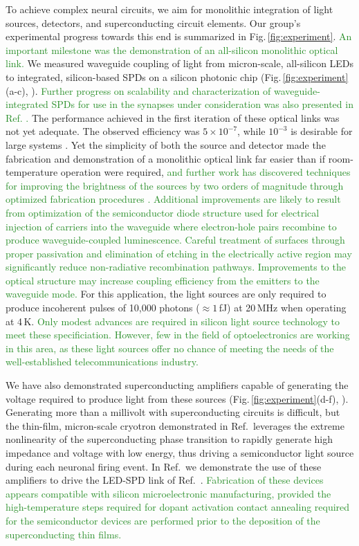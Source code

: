 \documentclass[twocolumn]{article}
\newcommand{\onlinecite}[1]{\hspace{-1 ex} \nocite{#1}\citenum{#1}}
\begin{document}
To achieve complex neural circuits, we aim for monolithic integration of light sources, detectors, and superconducting circuit elements. Our group's experimental progress towards this end is summarized in Fig.\,\ref{fig:experiment}. \textcolor{ForestGreen}{An important milestone was the demonstration of an all-silicon monolithic optical link.} We measured waveguide coupling of light from micron-scale, all-silicon LEDs to integrated, silicon-based SPDs on a silicon photonic chip (Fig.\,\ref{fig:experiment}(a-c), \cite{buch2017}). \textcolor{ForestGreen}{Further progress on scalability and characterization of waveguide-integrated SPDs for use in the synapses under consideration was also presented in Ref. \onlinecite{buta2020_2}.} The performance achieved in the first iteration of these optical links was not yet adequate. The observed efficiency was $5\times10^{-7}$, while $10^{-3}$ is desirable for large systems \cite{sh2019}. Yet the simplicity of both the source and detector made the fabrication and demonstration of a monolithic optical link far easier than if room-temperature operation were required, \textcolor{ForestGreen}{and further work has discovered techniques for improving the brightness of the sources by two orders of magnitude through optimized fabrication procedures \cite{buta2020}. Additional improvements are likely to result from optimization of the semiconductor diode structure used for electrical injection of carriers into the waveguide where electron-hole pairs recombine to produce waveguide-coupled luminescence. Careful treatment of surfaces through proper passivation and elimination of etching in the electrically active region may significantly reduce non-radiative recombination pathways. Improvements to the optical structure may increase coupling efficiency from the emitters to the waveguide mode.} For this application, the light sources are only required to produce incoherent pulses of 10,000 photons ($\approx 1$\,fJ) at 20\,MHz when operating at 4\,K. \textcolor{ForestGreen}{Only modest advances are required in silicon light source technology to meet these specificiation. However, few in the field of optoelectronics are working in this area, as these light sources offer no chance of meeting the needs of the well-established telecommunications industry.}

We have also demonstrated superconducting amplifiers capable of generating the voltage required to produce light from these sources (Fig.\,\ref{fig:experiment}(d-f), \cite{mcve2019}). Generating more than a millivolt with superconducting circuits is difficult, but the thin-film, micron-scale cryotron demonstrated in Ref.\,\cite{mcve2019} leverages the extreme nonlinearity of the superconducting phase transition to rapidly generate high impedance and voltage with low energy, thus driving a semiconductor light source during each neuronal firing event. In Ref.\,\onlinecite{mcve2019} we demonstrate the use of these amplifiers to drive the LED-SPD link of Ref.\,\onlinecite{buch2017}. \textcolor{ForestGreen}{Fabrication of these devices appears compatible with silicon microelectronic manufacturing, provided the high-temperature steps required for dopant activation contact annealing required for the semiconductor devices are performed prior to the deposition of the superconducting thin films.}
\end{document}
